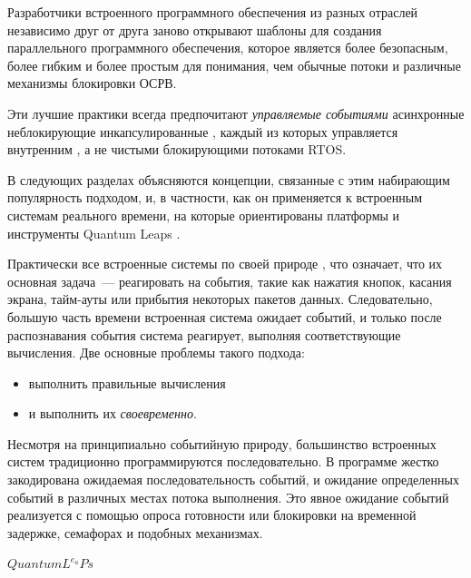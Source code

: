 \label{event}\secdown

\clearpage
Разработчики встроенного программного обеспечения из разных отраслей независимо
друг от друга заново открывают шаблоны для создания параллельного программного
обеспечения, которое является более безопасным, более гибким и более простым для
понимания, чем обычные потоки и различные механизмы блокировки
ОСРВ.

Эти лучшие практики всегда предпочитают \emph{управляемые
событиями} асинхронные
неблокирующие инкапсулированные , каждый из которых
управляется внутренним , а не чистыми блокирующими
потоками RTOS.

В следующих разделах объясняются концепции, связанные с этим набирающим
популярность  подходом, и, в частности, как он применяется к
встроенным системам реального времени, на которые ориентированы платформы и
инструменты Quantum Leaps \cite{psicc2}.

Практически все встроенные системы по своей природе , что
означает, что их основная задача\ --- реагировать на события, такие как нажатия
кнопок, касания экрана, тайм-ауты или прибытия некоторых пакетов данных.
Следовательно, большую часть времени встроенная система ожидает событий, и
только после распознавания события система реагирует, выполняя соответствующие
вычисления. Две основные проблемы такого подхода:
\begin{itemize}[nosep]
\item выполнить правильные вычисления 
\item и выполнить их \emph{своевременно}.
\end{itemize}
Несмотря на принципиально событийную природу, большинство встроенных систем
традиционно программируются последовательно. В программе жестко закодирована
ожидаемая последовательность событий, и ожидание определенных событий в
различных местах потока выполнения. Это явное ожидание событий реализуется с
помощью опроса готовности или блокировки на временной задержке, семафорах и
подобных механизмах.

\label{qp}

{\Huge \href{https://www.state-machine.com/}{$QuantumL^{e_a}Ps$}\ \cite{psicc2}}


\secup
